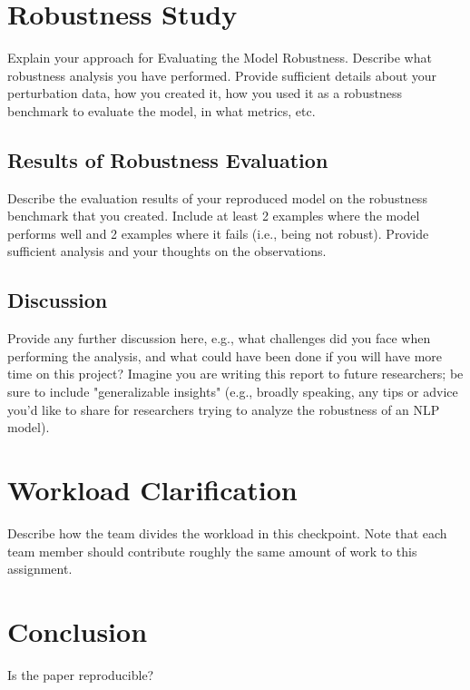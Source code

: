 \documentclass[11pt,a4paper]{article}
\begin{document}
\section{Robustness Study}
Explain your approach for Evaluating the Model Robustness. Describe what robustness analysis you have performed. Provide sufficient details about your perturbation data, how you created it, how you used it as a robustness benchmark to evaluate the model, in what metrics, etc.

\subsection{Results of Robustness Evaluation}
Describe the evaluation results of your reproduced model on the robustness benchmark that you created. Include at least 2 examples where the model performs well and 2 examples where it fails (i.e., being not robust). Provide sufficient analysis and your thoughts on the observations.

\subsection{Discussion} 
Provide any further discussion here, e.g., what challenges did you face when performing the analysis, and what could have been done if you will have more time on this project? Imagine you are writing this report to future researchers; be sure to include "generalizable insights" (e.g., broadly speaking, any tips or advice you'd like to share for researchers trying to analyze the robustness of an NLP model).

\section{Workload Clarification}
Describe how  the team divides the workload in this checkpoint. Note that each team member should contribute roughly the same amount of work to this assignment.

\section{Conclusion}
Is the paper reproducible?

\end{document}
